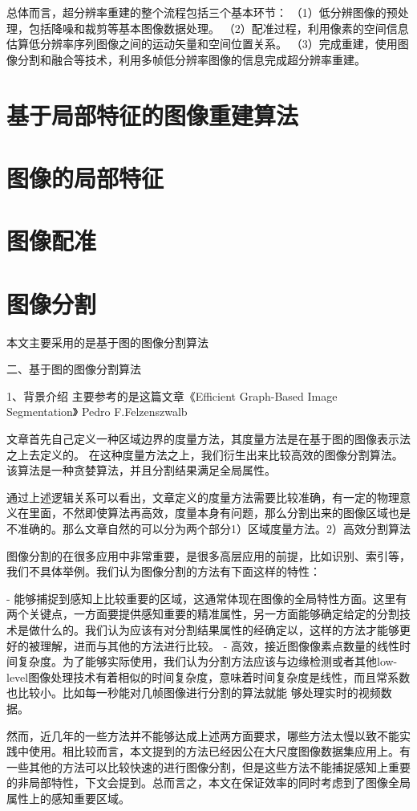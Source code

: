 总体而言，超分辨率重建的整个流程包括三个基本环节：
（1）低分辨图像的预处理，包括降噪和裁剪等基本图像数据处理。
（2）配准过程，利用像素的空间信息估算低分辨率序列图像之间的运动矢量和空间位置关系。
（3）完成重建，使用图像分割和融合等技术，利用多帧低分辨率图像的信息完成超分辨率重建。

\section{基于局部特征的图像重建算法}
\section{图像的局部特征}
\section{图像配准}
\section{图像分割}

本文主要采用的是基于图的图像分割算法

二、基于图的图像分割算法

1、背景介绍
主要参考的是这篇文章《Efficient Graph-Based Image Segmentation》 Pedro F.Felzenszwalb

文章首先自己定义一种区域边界的度量方法，其度量方法是在基于图的图像表示法之上去定义的。
在这种度量方法之上，我们衍生出来比较高效的图像分割算法。该算法是一种贪婪算法，并且分割结果满足全局属性。

通过上述逻辑关系可以看出，文章定义的度量方法需要比较准确，有一定的物理意义在里面，不然即使算法再高效，度量本身有问题，那么分割出来的图像区域也是不准确的。那么文章自然的可以分为两个部分1）区域度量方法。2）高效分割算法

图像分割的在很多应用中非常重要，是很多高层应用的前提，比如识别、索引等，我们不具体举例。我们认为图像分割的方法有下面这样的特性：

- 能够捕捉到感知上比较重要的区域，这通常体现在图像的全局特性方面。这里有两个关键点，一方面要提供感知重要的精准属性，另一方面能够确定给定的分割技术是做什么的。我们认为应该有对分割结果属性的经确定以，这样的方法才能够更好的被理解，进而与其他的方法进行比较。
- 高效，接近图像像素点数量的线性时间复杂度。为了能够实际使用，我们认为分割方法应该与边缘检测或者其他low-level图像处理技术有着相似的时间复杂度，意味着时间复杂度是线性，而且常系数也比较小。比如每一秒能对几帧图像进行分割的算法就能
够处理实时的视频数据。

然而，近几年的一些方法并不能够达成上述两方面要求，哪些方法太慢以致不能实践中使用。相比较而言，本文提到的方法已经因公在大尺度图像数据集应用上。有一些其他的方法可以比较快速的进行图像分割，但是这些方法不能捕捉感知上重要的非局部特性，下文会提到。总而言之，本文在保证效率的同时考虑到了图像全局属性上的感知重要区域。

